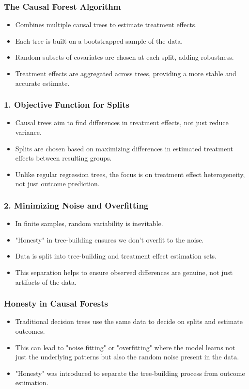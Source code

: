 \documentclass{beamer}
\begin{document}
\begin{frame}
\frametitle{The Causal Forest Algorithm}
\begin{itemize}
    \item Combines multiple causal trees to estimate treatment effects.
    \item Each tree is built on a bootstrapped sample of the data.
    \item Random subsets of covariates are chosen at each split, adding robustness.
    \item Treatment effects are aggregated across trees, providing a more stable and accurate estimate.
\end{itemize}
\end{frame}


\begin{frame}
\frametitle{1. Objective Function for Splits}
\begin{itemize}
\item Causal trees aim to find differences in treatment effects, not just reduce variance.
\item Splits are chosen based on maximizing differences in estimated treatment effects between resulting groups.
\item Unlike regular regression trees, the focus is on treatment effect heterogeneity, not just outcome prediction.
\end{itemize}
\end{frame}

\begin{frame}
\frametitle{2. Minimizing Noise and Overfitting}
\begin{itemize}
\item In finite samples, random variability is inevitable.
\item "Honesty" in tree-building ensures we don't overfit to the noise. 
\item Data is split into tree-building and treatment effect estimation sets.
\item This separation helps to ensure observed differences are genuine, not just artifacts of the data.
\end{itemize}
\end{frame}

\begin{frame}
\frametitle{Honesty in Causal Forests}
\begin{itemize}
\item Traditional decision trees use the same data to decide on splits and estimate outcomes.
\item This can lead to "noise fitting" or "overfitting" where the model learns not just the underlying patterns but also the random noise present in the data.
\item "Honesty" was introduced to separate the tree-building process from outcome estimation.
\end{itemize}
\end{frame}
\end{document}

